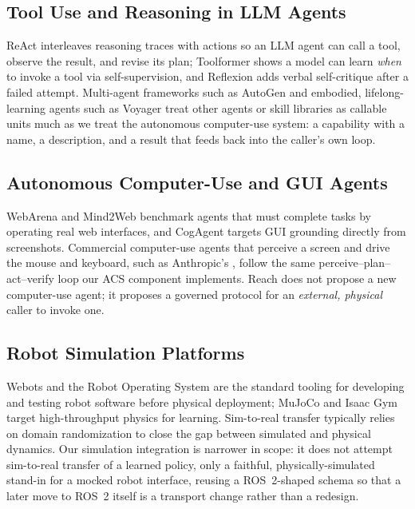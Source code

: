 \documentclass{article}
\begin{document}
\subsection{Tool Use and Reasoning in LLM Agents}
ReAct \citep{yao2023react} interleaves reasoning traces with actions so an
LLM agent can call a tool, observe the result, and revise its plan;
Toolformer \citep{schick2023toolformer} shows a model can learn \emph{when}
to invoke a tool via self-supervision, and Reflexion \citep{shinn2023reflexion}
adds verbal self-critique after a failed attempt. Multi-agent frameworks
such as AutoGen \citep{wu2023autogen} and embodied, lifelong-learning agents
such as Voyager \citep{wang2023voyager} treat other agents or skill libraries
as callable units much as we treat the autonomous computer-use system: a
capability with a name, a description, and a result that feeds back into
the caller's own loop.

\subsection{Autonomous Computer-Use and GUI Agents}
WebArena \citep{zhou2023webarena} and Mind2Web \citep{deng2023mind2web}
benchmark agents that must complete tasks by operating real web
interfaces, and CogAgent \citep{hong2023cogagent} targets GUI grounding
directly from screenshots. Commercial computer-use agents that perceive a
screen and drive the mouse and keyboard, such as
Anthropic's \citep{anthropic2024computeruse}, follow the same
perceive--plan--act--verify loop our ACS component implements. Reach does
not propose a new computer-use agent; it proposes a governed protocol for
an \emph{external, physical} caller to invoke one.

\subsection{Robot Simulation Platforms}
Webots \citep{michel2004webots} and the Robot Operating
System \citep{quigley2009ros} are the standard tooling for developing and
testing robot software before physical deployment; MuJoCo \citep{todorov2012mujoco}
and Isaac Gym \citep{makoviychuk2021isaacgym} target high-throughput
physics for learning. Sim-to-real transfer typically relies on domain
randomization \citep{tobin2017domain,peng2018simtoreal} to close the gap
between simulated and physical dynamics. Our simulation integration is
narrower in scope: it does not attempt sim-to-real transfer of a learned
policy, only a faithful, physically-simulated stand-in for a mocked robot
interface, reusing a ROS~2-shaped schema so that a later move to ROS~2
itself is a transport change rather than a redesign.
\end{document}
